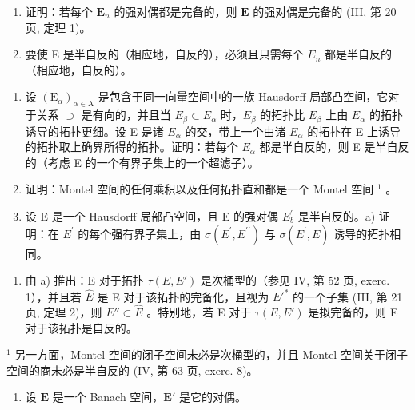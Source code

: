 \begin{enumerate}
\def\labelenumi{\alph{enumi})}
\item
  证明：若每个 \(\mathbf{E}_n\) 的强对偶都是完备的，则 \(\mathbf{E}\) 的强对偶是完备的 (III, 第 20 页, 定理 1)。
\item
  要使 E 是半自反的（相应地，自反的），必须且只需每个 \(E_{n}\) 都是半自反的（相应地，自反的）。
\end{enumerate}

\begin{enumerate}
\def\labelenumi{\arabic{enumi})}
\setcounter{enumi}{8}
\item
  设 \((\mathrm{E}_{\alpha})_{\alpha\in\mathrm{A}}\) 是包含于同一向量空间中的一族 Hausdorff 局部凸空间，它对于关系 \(\supset\) 是有向的，并且当 \(E_{\beta} \subset E_{\alpha}\) 时，\(E_{\beta}\) 的拓扑比 \(E_{\beta}\) 上由 \(E_{\alpha}\) 的拓扑诱导的拓扑更细。设 E 是诸 \(E_{\alpha}\) 的交，带上一个由诸 \(E_{\alpha}\) 的拓扑在 E 上诱导的拓扑取上确界所得的拓扑。证明：若每个 \(E_{\alpha}\) 都是半自反的，则 E 是半自反的（考虑 E 的一个有界子集上的一个超滤子）。
\item
  证明：Montel 空间的任何乘积以及任何拓扑直和都是一个 Montel 空间 \(^{1}\) 。
\item
  设 E 是一个 Hausdorff 局部凸空间，且 E 的强对偶 \(E_{b}^{\prime}\) 是半自反的。a) 证明：在 \(E^{\prime}\) 的每个强有界子集上，由 \(\sigma(E^{\prime}, E^{\prime\prime})\) 与 \(\sigma(E^{\prime}, E)\) 诱导的拓扑相同。
\end{enumerate}

\begin{enumerate}
\def\labelenumi{\alph{enumi})}
\setcounter{enumi}{1}
\tightlist
\item
  由 a) 推出：E 对于拓扑 \(\tau(E, E')\) 是次桶型的（参见 IV, 第 52 页, exerc. 1），并且若 \(\hat{E}\) 是 E 对于该拓扑的完备化，且视为 \(E'^{*}\) 的一个子集 (III, 第 21 页, 定理 2)，则 \(E'' \subset \hat{E}\) 。特别地，若 E 对于 \(\tau(E, E')\) 是拟完备的，则 E 对于该拓扑是自反的。
\end{enumerate}

\(^{1}\) 另一方面，Montel 空间的闭子空间未必是次桶型的，并且 Montel 空间关于闭子空间的商未必是半自反的 (IV, 第 63 页, exerc. 8)。

\begin{enumerate}
\def\labelenumi{\arabic{enumi})}
\setcounter{enumi}{11}
\tightlist
\item
  设 \(\mathbf{E}\) 是一个 Banach 空间，\(\mathbf{E}'\) 是它的对偶。
\end{enumerate}

